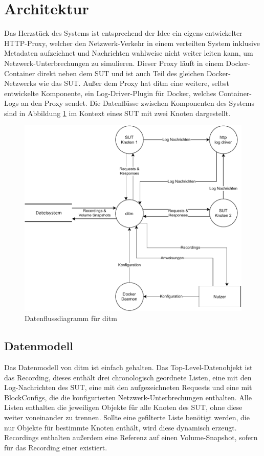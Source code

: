 \documentclass[12pt,a4paper]{report}
\begin{document}
\section{Architektur}
Das Herzstück des Systems ist entsprechend der Idee ein eigens entwickelter HTTP-Proxy, welcher den Netzwerk-Verkehr in einem
verteilten System inklusive Metadaten aufzeichnet und Nachrichten wahlweise nicht weiter leiten kann, um Netzwerk-Unterbrechungen
zu simulieren. Dieser Proxy läuft in einem Docker-Container direkt neben dem SUT und ist auch Teil des gleichen Docker-Netzwerks
wie das SUT. Außer dem Proxy hat ditm eine weitere, selbst entwickelte Komponente, ein Log-Driver-Plugin für Docker, welches
Container-Logs an den Proxy sendet. Die Datenflüsse zwischen Komponenten des Systems sind in Abbildung \ref{fig:dataflow} im
Kontext eines SUT mit zwei Knoten dargestellt.
\begin{figure}[H]
	\centering
	\includegraphics[width=\linewidth]{img/ditm-Dataflow.pdf}
	\caption{Datenflussdiagramm für ditm}
	\label{fig:dataflow}
\end{figure}

\subsection{Datenmodell}
Das Datenmodell von ditm ist einfach gehalten. Das Top-Level-Datenobjekt ist das Recording, dieses enthält drei chronologisch
geordnete Listen, eine mit den Log-Nachrichten des SUT, eine mit den aufgezeichneten Requests und eine mit BlockConfigs, die die
konfigurierten Netzwerk-Unterbrechungen enthalten. Alle Listen enthalten die jeweiligen Objekte für alle Knoten des SUT, ohne
diese weiter voneinander zu trennen. Sollte eine gefilterte Liste benötigt werden, die nur Objekte für bestimmte Knoten enthält,
wird diese dynamisch erzeugt. Recordings enthalten außerdem eine Referenz auf einen Volume-Snapshot, sofern für das Recording
einer existiert.
\end{document}
